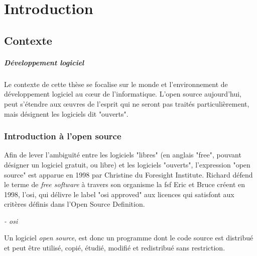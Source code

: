 \chapter{Introduction}

	\section{Contexte}

		\paragraph{Développement logiciel \\}
		
			 Le contexte de cette thèse se focalise sur le monde et l'environnement de développement logiciel au cœur de l'informatique. L'\Gls{open source} aujourd'hui, peut s'étendre aux œuvres de l'esprit qui ne seront pas traités particulièrement, mais désignent les logiciels dit "ouverts".
		
		\subsection{Introduction à l'open source}

			Afin de lever l'ambiguïté entre les logiciels "libres" (en anglais "free", pouvant désigner un logiciel gratuit, ou libre) et les logiciels "ouverts", l'expression "\gls{open source}" est apparue en 1998 par Christine  du Foresight Institute.
			Richard  défend le terme de \textit{free software} à travers son organisme la \acrfull{fsf}
			Eric  et Bruce  créent en 1998, l'\acrfull{osi}, qui délivre le label "\acrshort{osi} approved" aux licences qui satisfont aux critères définis dans l'Open Source Definition.

			\begin{center}
				\textit{
				 - \acrshort{osi}
				}
			\end{center}

			Un logiciel \textit{open source}, est donc un programme dont le code source est distribué et peut être utilisé, copié, étudié, modifié et redistribué sans restriction.

